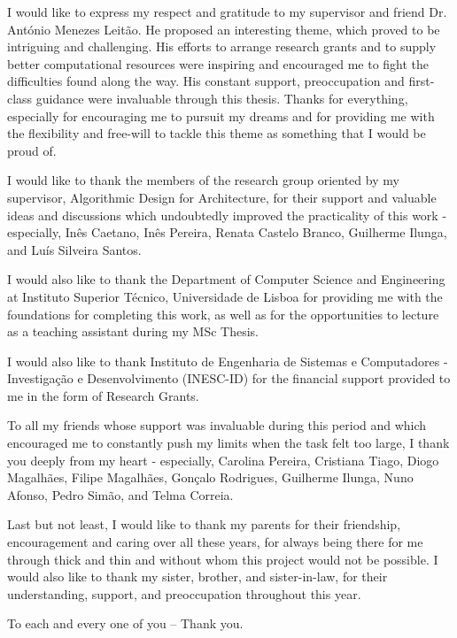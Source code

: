 
I would like to express my respect and gratitude to my supervisor and friend Dr. António Menezes Leitão. He proposed an interesting theme, which proved to be intriguing and challenging. His efforts to arrange research grants and to supply better computational resources were inspiring and encouraged me to fight the difficulties found along the way. His constant support, preoccupation and first-class guidance were invaluable through this thesis. Thanks for everything, especially for encouraging me to pursuit my dreams and for providing me with the flexibility and free-will to tackle this theme as something that I would be proud of.  

I would like to thank the members of the research group oriented by my supervisor, Algorithmic Design for Architecture, for their support and valuable ideas and discussions which undoubtedly improved the practicality of this work - especially, Inês Caetano, Inês Pereira, Renata Castelo Branco, Guilherme Ilunga, and Luís Silveira Santos. 

I would also like to thank the Department of Computer Science and Engineering at Instituto Superior Técnico, Universidade de Lisboa for providing me with the foundations for completing this work, as well as for the opportunities to lecture as a teaching assistant during my MSc Thesis. 

I would also like to thank Instituto de Engenharia de Sistemas e Computadores - Investigação e Desenvolvimento (INESC-ID) for the financial support provided to me in the form of Research Grants.


To all my friends whose support was invaluable during this period and which encouraged me to constantly push my limits when the task felt too large, I thank you deeply from my heart - especially, Carolina Pereira, Cristiana Tiago, Diogo Magalhães, Filipe Magalhães, Gonçalo Rodrigues, Guilherme Ilunga, Nuno Afonso, Pedro Simão, and Telma Correia.

Last but not least, I would like to thank my parents for their friendship, encouragement and caring over all these years, for always being there for me through thick and thin and without whom this project would not be possible. I would also like to thank my sister, brother, and sister-in-law, for their understanding, support, and preoccupation throughout this year.

To each and every one of you -- Thank you.